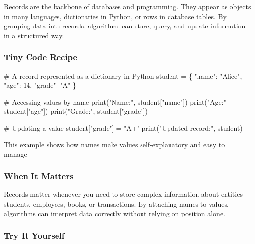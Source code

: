 \documentclass[
  letterpaper,
  DIV=11,
  numbers=noendperiod]{scrreprt}
\newenvironment{Shaded}{\begin{snugshade}}{\end{snugshade}}
\newcommand{\BuiltInTok}[1]{\textcolor[rgb]{0.00,0.23,0.31}{#1}}
\newcommand{\CommentTok}[1]{\textcolor[rgb]{0.37,0.37,0.37}{#1}}
\newcommand{\DecValTok}[1]{\textcolor[rgb]{0.68,0.00,0.00}{#1}}
\newcommand{\NormalTok}[1]{\textcolor[rgb]{0.00,0.23,0.31}{#1}}
\newcommand{\OperatorTok}[1]{\textcolor[rgb]{0.37,0.37,0.37}{#1}}
\newcommand{\StringTok}[1]{\textcolor[rgb]{0.13,0.47,0.30}{#1}}
\begin{document}
Records are the backbone of databases and programming. They appear as
objects in many languages, dictionaries in Python, or rows in database
tables. By grouping data into records, algorithms can store, query, and
update information in a structured way.

\subsubsection{Tiny Code Recipe}\label{tiny-code-recipe-52}

\begin{Shaded}
\begin{Highlighting}[]
\CommentTok{\# A record represented as a dictionary in Python}
\NormalTok{student }\OperatorTok{=}\NormalTok{ \{}
    \StringTok{"name"}\NormalTok{: }\StringTok{"Alice"}\NormalTok{,}
    \StringTok{"age"}\NormalTok{: }\DecValTok{14}\NormalTok{,}
    \StringTok{"grade"}\NormalTok{: }\StringTok{"A"}
\NormalTok{\}}

\CommentTok{\# Accessing values by name}
\BuiltInTok{print}\NormalTok{(}\StringTok{"Name:"}\NormalTok{, student[}\StringTok{"name"}\NormalTok{])}
\BuiltInTok{print}\NormalTok{(}\StringTok{"Age:"}\NormalTok{, student[}\StringTok{"age"}\NormalTok{])}
\BuiltInTok{print}\NormalTok{(}\StringTok{"Grade:"}\NormalTok{, student[}\StringTok{"grade"}\NormalTok{])}

\CommentTok{\# Updating a value}
\NormalTok{student[}\StringTok{"grade"}\NormalTok{] }\OperatorTok{=} \StringTok{"A+"}
\BuiltInTok{print}\NormalTok{(}\StringTok{"Updated record:"}\NormalTok{, student)}
\end{Highlighting}
\end{Shaded}

This example shows how names make values self-explanatory and easy to
manage.

\subsubsection{When It Matters}\label{when-it-matters-52}

Records matter whenever you need to store complex information about
entities---students, employees, books, or transactions. By attaching
names to values, algorithms can interpret data correctly without relying
on position alone.

\subsubsection{Try It Yourself}\label{try-it-yourself-54}
\end{document}
